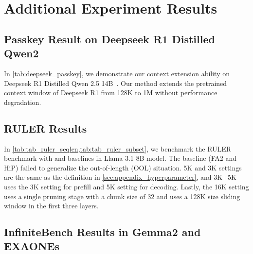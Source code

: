 % 


\newpage
\section{Additional Experiment Results}

\subsection{Passkey Result on Deepseek R1 Distilled Qwen2}



In \cref{tab:deepseek_passkey}, we demonstrate our context extension ability on Deepseek R1 Distilled Qwen 2.5 14B~\citep{deepseekai2025deepseekr1incentivizingreasoningcapability}. Our method extends the pretrained context window of Deepseek R1 from 128K to 1M without performance degradation.

\subsection{RULER Results}




In \cref{tab:tab_ruler_seqlen,tab:tab_ruler_subset}, we benchmark the RULER benchmark with \ours and baselines in Llama 3.1 8B model. The baseline (FA2 and HiP) failed to generalize the out-of-length (OOL) situation. 5K and 3K settings are the same as the definition in \cref{sec:appendix_hyperparameter}, and 3K+5K uses the 3K setting for prefill and 5K setting for decoding. Lastly, the 16K setting uses a single pruning stage with a chunk size of 32 and uses a 128K size sliding window in the first three layers.

\subsection{InfiniteBench Results in Gemma2 and EXAONEs}

